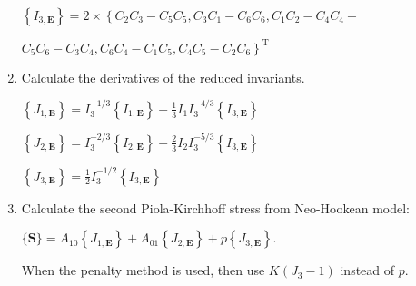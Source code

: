 \begin{enumerate}
$ \left\{I_{3, \mathbf{E}}\right\}=2 \times\left\{C_{2} C_{3}-C_{5} C_{5}, C_{3} C_{1}-C_{6} C_{6}, C_{1} C_{2}-C_{4} C_{4} - \right. $



$ \left.C_{5} C_{6}-C_{3} C_{4}, C_{6} C_{4}-C_{1} C_{5}, C_{4} C_{5}-C_{2} C_{6}\right\}^{\mathrm{T}} $



\item  Calculate the derivatives of the reduced invariants.



$ \left\{J_{1, \mathbf{E}}\right\}=I_{3}^{-1 / 3}\left\{I_{1, \mathbf{E}}\right\}-\frac{1}{3} I_{1} I_{3}^{-4 / 3}\left\{I_{3, \mathbf{E}}\right\} $

$ \left\{J_{2, \mathbf{E}}\right\}=I_{3}^{-2 / 3}\left\{I_{2, \mathbf{E}}\right\}-\frac{2}{3} I_{2} I_{3}^{-5 / 3}\left\{I_{3, \mathbf{E}}\right\} $



$ \left\{J_{3, \mathbf{E}}\right\}=\frac{1}{2} I_{3}^{-1 / 2}\left\{I_{3, \mathbf{E}}\right\} $



\item  Calculate the second Piola-Kirchhoff stress from Neo-Hookean model:

$ \{\mathbf{S}\}=A_{10}\left\{J_{1, \mathbf{E}}\right\}+A_{01}\left\{J_{2, \mathbf{E}}\right\}+p\left\{J_{3, \mathbf{E}}\right\} . $

When the penalty method is used, then use $ K\left(J_{3}-1\right) $ instead of $ p $.

\end{enumerate}

